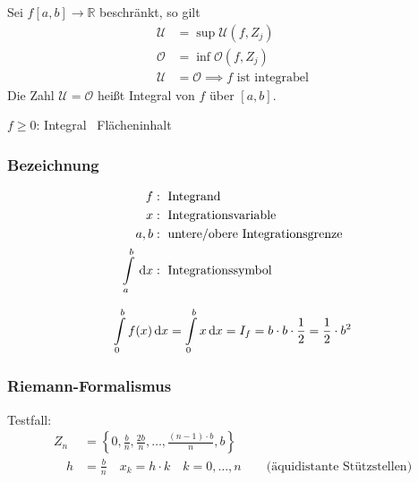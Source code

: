 \begin{definition}[Integrierbarkeit]
	Sei \( f[a,b] \rightarrow \mathbb{R} \) beschränkt, so gilt
	\begin{align*}
		\mathcal U &= \sup \mathcal U(f,Z_j)\\
		\mathcal O &= \inf \mathcal O(f,Z_j)\\
		\mathcal U &= \mathcal O \implies \text{$f$ ist integrabel}
	\end{align*}
	Die Zahl \( \mathcal U = \mathcal O \) heißt Integral von \( f \) über \( [a,b] \).
\end{definition}

\begin{note}
	\( f \geq 0 \): Integral \equals\ Flächeninhalt
\end{note}

\subsubsection*{Bezeichnung}
\begin{align*}
	f&: \text{ Integrand} \\
	x&: \text{ Integrationsvariable}\\
	a,b&: \text{ untere/obere Integrationsgrenze}\\	
	\int\limits_a^b \,\mathrm d x &:\text{ Integrationssymbol}
\end{align*}

\begin{example}[\mbox{$f(x)=x$ in $[0,b]$}]
	\[
		\int\limits_0^b f(x) \,\mathrm d x = \int\limits_0^b x \,\mathrm d x = I_f = b \cdot b \cdot \frac{1}{2} = \frac{1}{2} \cdot b^2
	\]
\end{example}


\begin{center}
\end{center}


\subsubsection*{Riemann-Formalismus}
Testfall:
\begin{align*}
	Z_n &= \left\{0,\frac{b}{n},\frac{2b}{n},\ldots,\frac{(n-1)\cdot b}{n}, b\right\} \\
	\quad h &= \frac{b}{n} \quad x_k=h \cdot k \quad k=0,\ldots,n \qquad \text{(äquidistante Stützstellen)} 
\end{align*}

